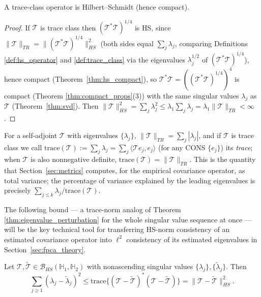 \begin{theorem}
\label{thm:trace_is_hs}
A trace-class operator is Hilbert--Schmidt (hence compact).
\end{theorem}

\begin{proof}
If $\mathcal{T}$ is trace class then $(\mathcal{T}^*\mathcal{T})^{1/4}$ is
HS, since $\|\mathcal{T}\|_{TR}=\|(\mathcal{T}^*\mathcal{T})^{1/4}\|_{HS}^2$
(both sides equal $\sum_j\lambda_j$, comparing Definitions
\ref{def:hs_operator} and \ref{def:trace_class} via the eigenvalues
$\lambda_j^{1/2}$ of $(\mathcal{T}^*\mathcal{T})^{1/4}$), hence compact
(Theorem~\ref{thm:hs_compact}), so $\mathcal{T}^*\mathcal{T}=
((\mathcal{T}^*\mathcal{T})^{1/4})^4$ is compact (Theorem
\ref{thm:compact_props}(3)) with the same singular values $\lambda_j$ as
$\mathcal{T}$ (Theorem~\ref{thm:svd}). Then $\|\mathcal{T}\|_{HS}^2 =
\sum_j\lambda_j^2 \leq \lambda_1\sum_j\lambda_j = \lambda_1\|\mathcal{T}
\|_{TR}<\infty$.
\end{proof}

For a self-adjoint $\mathcal{T}$ with eigenvalues $\{\lambda_j\}$,
$\|\mathcal{T}\|_{TR}=\sum_j|\lambda_j|$, and if $\mathcal{T}$ is trace
class we call $\mathrm{trace}(\mathcal{T}):=\sum_j\lambda_j=\sum_j\langle
\mathcal{T}e_j,e_j\rangle$ (for any CONS $\{e_j\}$) its \emph{trace}; when
$\mathcal{T}$ is also nonnegative definite, $\mathrm{trace}(\mathcal{T}) =
\|\mathcal{T}\|_{TR}$. This is the quantity that Section~\ref{sec:metrics}
computes, for the empirical covariance operator, as total variance; the
percentage of variance explained by the leading eigenvalues is precisely
$\sum_{j\leq k}\lambda_j/\mathrm{trace}(\mathcal{T})$.

The following bound --- a trace-norm analog of Theorem
\ref{thm:eigenvalue_perturbation} for the whole singular value sequence at
once --- will be the key technical tool for transferring HS-norm
consistency of an estimated covariance operator into $\ell^2$ consistency
of its estimated eigenvalues in Section~\ref{sec:fpca_theory}.

\begin{theorem}
\label{thm:von_neumann}
Let $\mathcal{T},\widetilde{\mathcal{T}}\in\mathcal{B}_{HS}(\mathbb{H}_1,
\mathbb{H}_2)$ with nonascending singular values $\{\lambda_j\},
\{\widetilde\lambda_j\}$. Then
\begin{equation}
\sum_{j\geq 1}(\lambda_j-\widetilde\lambda_j)^2 \leq \mathrm{trace}\big\{
(\mathcal{T}-\widetilde{\mathcal{T}})^*(\mathcal{T}-\widetilde{\mathcal{T}})
\big\} = \|\mathcal{T}-\widetilde{\mathcal{T}}\|_{HS}^2.
\label{eq:von_neumann}
\end{equation}
\end{theorem}

